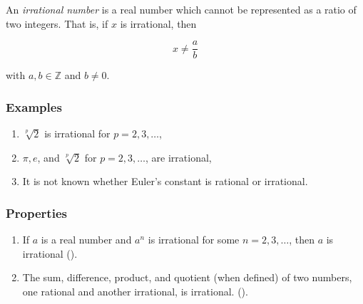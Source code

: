 \documentclass[12pt]{article}
\begin{document}
An \emph{irrational number} is a real number which cannot be represented as a ratio of two integers.  That is, if $x$ is irrational, then 

$$ x \ne \frac{a}{b} $$

with $a,b \in \mathbb{Z}$ and $b \ne 0$.

\subsubsection*{Examples}
\begin{enumerate}
\item $\sqrt[p]{2}$ is irrational for $p=2,3,\ldots$,
\item $\pi, e$, and $\sqrt[p]{2}$ for $p=2,3,\ldots$,
       are irrational,
\item It is not known whether Euler's constant is rational or irrational.
\end{enumerate}

\subsubsection*{Properties}
\begin{enumerate}
\item If $a$ is a real number and $a^n$ is irrational for some $n=2,3,\ldots$, 
then $a$ is irrational (). 
\item The sum, difference, product, and quotient (when defined) of two numbers,
one rational and another irrational, is irrational. 
(). 
\end{enumerate}
\end{document}
